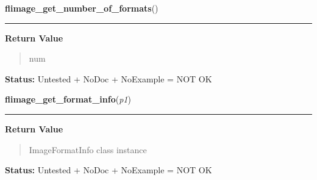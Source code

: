     \label{xformslib:library:flimage_get_number_of_formats}

    \vspace{0.5ex}

\hspace{.8\funcindent}\begin{boxedminipage}{\funcwidth}

    \raggedright \textbf{flimage\_get\_number\_of\_formats}()

    \vspace{-1.5ex}

    \rule{\textwidth}{0.5\fboxrule}
\setlength{\parskip}{2ex}
\setlength{\parskip}{1ex}
      \textbf{Return Value}
    \vspace{-1ex}

      \begin{quote}
      num

      \end{quote}

\textbf{Status:} Untested + NoDoc + NoExample = NOT OK



    \end{boxedminipage}

    \label{xformslib:library:flimage_get_format_info}

    \vspace{0.5ex}

\hspace{.8\funcindent}\begin{boxedminipage}{\funcwidth}

    \raggedright \textbf{flimage\_get\_format\_info}(\textit{p1})

    \vspace{-1.5ex}

    \rule{\textwidth}{0.5\fboxrule}
\setlength{\parskip}{2ex}
\setlength{\parskip}{1ex}
      \textbf{Return Value}
    \vspace{-1ex}

      \begin{quote}
      ImageFormatInfo class instance

      \end{quote}

\textbf{Status:} Untested + NoDoc + NoExample = NOT OK



    \end{boxedminipage}

